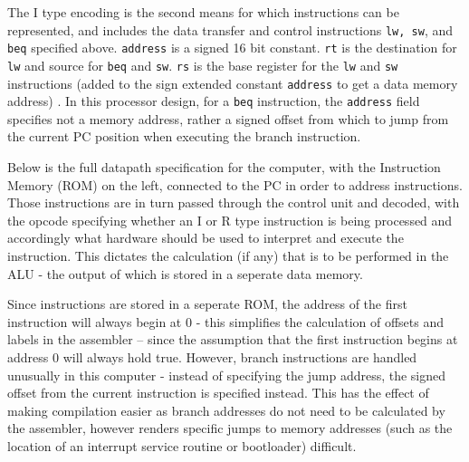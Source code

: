 \bigskip


\bigskip

The I type encoding is the second means for which instructions can be represented, and includes the data transfer and control instructions \texttt{lw, sw}, and \texttt{beq} specified above. \texttt{address} is a signed 16 bit constant. \texttt{rt} is the destination for \texttt{lw} and source for \texttt{beq} and \texttt{sw}. \texttt{rs} is the base register for the \texttt{lw} and \texttt{sw} instructions (added to the sign extended constant \texttt{address} to get a data memory address) \textcite{MIPS-uw}. In this processor design, for a \texttt{beq} instruction, the \texttt{address} field specifies not a memory address, rather a signed offset from which to jump from the current PC position when executing the branch instruction.

\bigskip


\bigskip

Below is the full datapath specification for the computer, with the Instruction Memory (ROM) on the left, connected to the PC in order to address instructions. Those instructions are in turn passed through the control unit and decoded, with the opcode specifying whether an I or R type instruction is being processed and accordingly what hardware should be used to interpret and execute the instruction. This dictates the calculation (if any) that is to be performed in the ALU - the output of which is stored in a seperate data memory.

Since instructions are stored in a seperate ROM, the address of the first instruction will always begin at 0 - this simplifies the calculation of offsets and labels in the assembler – since the assumption that the first instruction begins at address 0 will always hold true. However, branch instructions are handled unusually in this computer - instead of specifying the jump address, the signed offset from the current instruction is specified instead. This has the effect of making compilation easier as branch addresses do not need to be calculated by the assembler, however renders specific jumps to memory addresses (such as the location of an interrupt service routine or bootloader) difficult.

\bigskip

